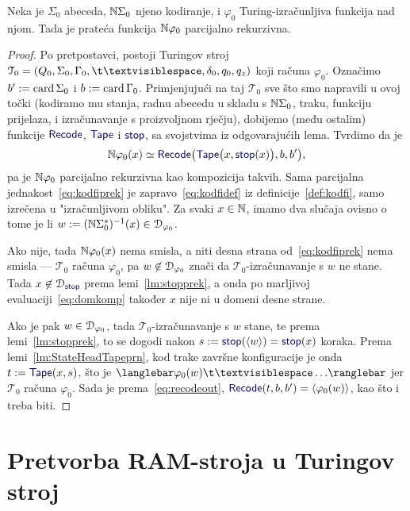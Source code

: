 \begin{teorem}[{name=[parcijalna rekurzivnost pratećih Turing-izračunljivih funkcija]}]\label{tm:tikp}
Neka je $\Sigma_0$ abeceda, ${\mathbb N}\Sigma_0$ njeno kodiranje, i $\varphi_0$ Turing-izračunljiva funkcija nad njom. Tada je prateća funkcija ${\mathbb N}\varphi_0$ parcijalno rekurzivna.
\end{teorem}
\begin{proof}
Po pretpostavci, postoji Turingov stroj $\mathcal T_0=(Q_0,\Sigma_0,\Gamma_0,\bl,\delta_0,q_0,q_z)$ koji računa $\varphi_0$. Označimo $b':=\operatorname{card}\Sigma_0$ i $b:=\operatorname{card}\Gamma_0$. Primjenjujući na taj $\mathcal T_0$ sve što smo napravili u ovoj točki (kodiramo mu stanja, radnu abecedu u skladu s ${\mathbb N}\Sigma_0$, traku, funkciju prijelaza, i izračunavanje s proizvoljnom rječju), dobijemo (među ostalim) funkcije $\f{Recode}$, $\f{Tape}$ i $\f{stop}$, sa svojstvima iz odgovarajućih lema. Tvrdimo da je
\begin{equation}\label{eq:kodfiprek}
    \N\varphi_0(x)\simeq
    \f{Recode}\bigl(\f{Tape}\bigl(x,\f{stop}(x)\bigr),b,b'\bigr)\text,
\end{equation}
pa je ${\mathbb N}\varphi_0$ parcijalno rekurzivna kao kompozicija takvih. Sama parcijalna jednakost~\eqref{eq:kodfiprek} je zapravo~\eqref{eq:kodfidef} iz definicije~\ref{def:kodfi}, samo izrečena u "izračunljivom obliku". Za svaki $x\in{\mathbb N}$, imamo dva slučaja ovisno o tome je li $w:=({\mathbb N}\Sigma_0^*)^{-1}(x)\in\mathcal D_{\varphi_0}$.

Ako nije, tada ${\mathbb N}\varphi_0(x)$ nema smisla, a niti desna strana od~\eqref{eq:kodfiprek} nema smisla --- $\mathcal T_0$ računa $\varphi_0$, pa $w\not\in\mathcal D_{\varphi_0}$ znači da $\mathcal T_0$-izračunavanje s $w$ ne stane. Tada $x\not\in\dom{\f{stop}}$ prema lemi~\ref{lm:stopprek}, a onda po marljivoj evaluaciji~\eqref{eq:domkomp} također $x$ nije ni u domeni desne strane.

Ako je pak $w\in\mathcal D_{\varphi_0}$, tada $\mathcal T_0$-izračunavanje s $w$ stane, te prema lemi~\ref{lm:stopprek}, to se dogodi nakon $s:=\f{stop}(\kr w)=\f{stop}(x)$ koraka. Prema lemi~\ref{lm:StateHeadTapeprn}, kod trake završne konfiguracije je onda $t:=\f{Tape}(x,s)$, što je $\knk{\varphi_0(w)\bl\ldots}$ jer $\mathcal T_0$ računa $\varphi_0$. Sada je prema~\eqref{eq:recodeout}, $\f{Recode}(t,b,b')=\kr{\varphi_0(w)}$, kao što i treba biti.
\end{proof}

\section{Pretvorba RAM-stroja u Turingov stroj}\label{sec:RAM>Turing}

